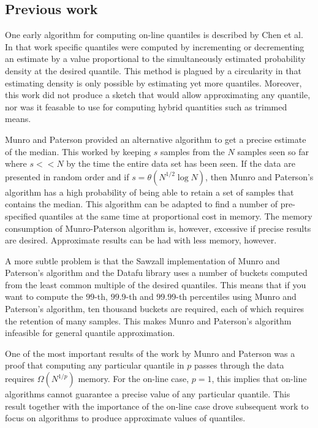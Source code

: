 \documentclass{vldb}
\begin{document}
\subsection{Previous work}

One early algorithm for computing on-line quantiles is described by Chen et al\cite{Chen2000}.  In that work specific quantiles were computed by incrementing or decrementing an estimate by a value proportional to the simultaneously estimated probability density at the desired quantile.  This method is plagued by a circularity in that estimating density is only possible by estimating yet more quantiles.  Moreover, this work did not produce a sketch that would allow approximating any quantile, nor was it feasable to use for computing hybrid quantities such as trimmed means.

Munro and Paterson \cite{munro1980} provided an alternative algorithm to get a precise estimate of the median.  This worked by keeping $s$ samples from the $N$ samples seen so far where $s << N$ by the time the entire data set has been seen.  If the data are presented in random order and if $s = \theta(N^{1/2} \log N)$, then Munro and Paterson's algorithm has a high probability of being able to retain a set of samples that contains the median.  This algorithm can be adapted to find a number of pre-specified quantiles at the same time at proportional cost in memory.  The memory consumption of Munro-Paterson algorithm is, however, excessive if precise results are desired.  Approximate results can be had with less memory, however.  

A more subtle problem is that the Sawzall implementation of Munro and Paterson's algorithm\cite{sawzall} and the Datafu library\cite{datafu} uses a number of buckets computed from the least common multiple of the desired quantiles.  This means that if you want to compute the $99$-th, $99.9$-th and $99.99$-th percentiles using Munro and Paterson's algorithm, ten thousand buckets are required, each of which requires the retention of many samples. This makes Munro and Paterson's algorithm infeasible for general quantile approximation.

One of the most important results of the work by Munro and Paterson was a proof that computing any particular quantile in $p$ passes through the data requires $\Omega(N^{1/p})$ memory. For the on-line case, $p=1$, this implies that on-line algorithms cannot guarantee a precise value of any particular quantile. This result together with the importance of the on-line case drove subsequent work to focus on algorithms to produce approximate values of quantiles.
\end{document}
